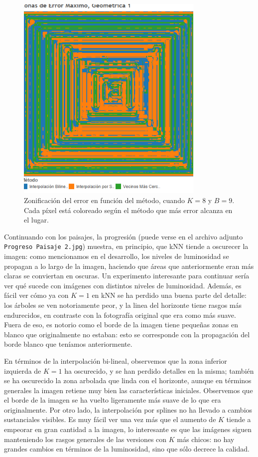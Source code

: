 \documentclass{article}
\begin{document}
\begin{figure}[H]
\centering
\includegraphics[width=9cm]{Zonas de Error Maximo Geometrica 1}
\caption{Zonificación del error en función del método, cuando $K=8$ y $B=9$. Cada píxel está coloreado según el método que más error alcanza en el lugar.}
\label{fig:zonas_error_geometrica_1}
\end{figure}

Continuando con los paisajes, la progresión (puede verse en el archivo adjunto \texttt{Progreso Paisaje 2.jpg}) muestra, en principio, que kNN tiende a oscurecer la imagen: como mencionamos en el desarrollo, los niveles de luminosidad se propagan a lo largo de la imagen, haciendo que áreas que anteriormente eran más claras se conviertan en oscuras. Un experimento interesante para continuar sería ver qué sucede con imágenes con distintos niveles de luminosidad. Además, es fácil ver cómo ya con $K=1$ en kNN se ha perdido una buena parte del detalle: los árboles se ven notoriamente peor, y la linea del horizonte tiene rasgos más endurecidos, en contraste con la fotografía original que era como más suave. Fuera de eso, es notorio como el borde de la imagen tiene pequeñas zonas en blanco que originalmente no estaban: esto se corresponde con la propagación del borde blanco que teníamos anteriormente.

En términos de la interpolación bi-lineal, observemos que la zona inferior izquierda de $K=1$ ha oscurecido, y se han perdido detalles en la misma; también se ha oscurecido la zona arbolada que linda con el horizonte, aunque en términos generales la imagen retiene muy bien las características iniciales. Observemos que el borde de la imagen se ha vuelto ligeramente más suave de lo que era originalmente. Por otro lado, la interpolación por splines no ha llevado a cambios sustanciales visibles. Es muy fácil ver una vez más que el aumento de $K$ tiende a empeorar en gran cantidad a la imagen, lo interesante es que las imágenes siguen manteniendo los rasgos generales de las versiones con $K$ más chicos: no hay grandes cambios en términos de la luminosidad, sino que sólo decrece la calidad.
\end{document}

